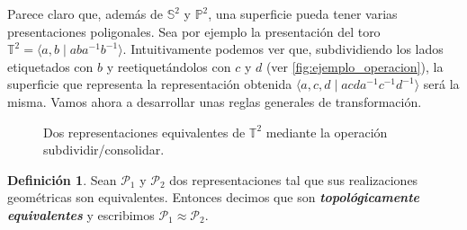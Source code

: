 \documentclass[10pt]{report}
\newcommand{\Esfera}{\mathbb{S}^2}
\newcommand{\Toro}{\mathbb{T}^2}
\newcommand{\Proyectivo}{\mathbb{P}^2}
\newcommand{\enfatiza}[1]{\textbf{\textit{#1}}}
\theoremstyle{definition}
\newtheorem{defin}{Definición}[section]
\begin{document}
Parece claro que, además de $\Esfera$ y $\Proyectivo$, una superficie pueda tener varias presentaciones poligonales. Sea por ejemplo la presentación del toro $\Toro=\langle a,b\mid aba^{-1}b^{-1}\rangle$. Intuitivamente podemos ver que, subdividiendo los lados etiquetados con $b$ y reetiquetándolos con $c$ y $d$ (ver \autoref{fig:ejemplo_operacion}), la superficie que representa la representación obtenida $\langle a,c,d\mid  acda^{-1}c^{-1}d^{-1}\rangle$ será la misma.
Vamos ahora a desarrollar unas reglas generales de transformación.

\begin{figure}%
\centering
{}

\caption{Dos representaciones equivalentes de $\Toro$ mediante la operación subdividir/consolidar. \label{fig:ejemplo_operacion}}
\end{figure}

\begin{defin}%
Sean $\mathcal{P}_1$ y $\mathcal{P}_2$ dos representaciones tal que sus realizaciones geométricas son equivalentes. Entonces decimos que son \enfatiza{topológicamente equivalentes} y escribimos $\mathcal{P}_1 \approx \mathcal{P}_2$.
\end{defin}
\end{document}
